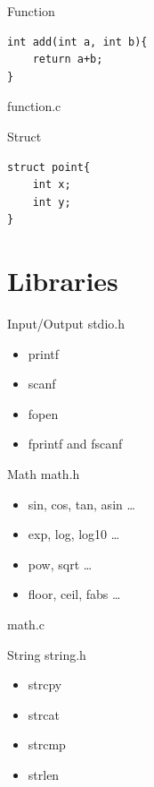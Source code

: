 \documentclass[UTF8]{beamer}
\begin{document}
\begin{frame}[t,fragile]{Function}
\begin{verbatim}
int add(int a, int b){
    return a+b;
}
\end{verbatim}
    function.c
\end{frame}

\begin{frame}[t,fragile]{Struct}
\begin{verbatim}
struct point{
    int x;
    int y;
}
\end{verbatim}
\end{frame}


\section{Libraries}
\begin{frame}[t]{Input/Output}
    stdio.h
    \begin{itemize}
        \item printf
        \item scanf
        \item fopen
        \item fprintf and fscanf
    \end{itemize}
\end{frame}

\begin{frame}[t]{Math}
    math.h
    \begin{itemize}
        \item sin, cos, tan, asin \ldots
        \item exp, log, log10 \ldots
        \item pow, sqrt \ldots
        \item floor, ceil, fabs \ldots
    \end{itemize}
    math.c
\end{frame}

\begin{frame}[t]{String}
    string.h
    \begin{itemize}
        \item strcpy
        \item strcat
        \item strcmp
        \item strlen
    \end{itemize}
\end{frame}
\end{document}
